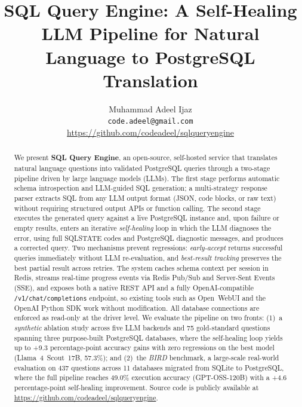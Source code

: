 \documentclass{article}
\title{SQL Query Engine: A Self-Healing LLM Pipeline for Natural Language to PostgreSQL Translation}
\author{
  Muhammad Adeel Ijaz \\
  \texttt{code.adeel@gmail.com} \\
  \url{https://github.com/codeadeel/sqlqueryengine}
}
\date{}
\begin{document}
\maketitle

\begin{abstract}
We present \textbf{SQL Query Engine}, an open-source, self-hosted service that translates natural language questions into validated PostgreSQL queries through a two-stage pipeline driven by large language models (LLMs). The first stage performs automatic schema introspection and LLM-guided SQL generation; a multi-strategy response parser extracts SQL from any LLM output format (JSON, code blocks, or raw text) without requiring structured output APIs or function calling. The second stage executes the generated query against a live PostgreSQL instance and, upon failure or empty results, enters an iterative \emph{self-healing} loop in which the LLM diagnoses the error, using full SQLSTATE codes and PostgreSQL diagnostic messages, and produces a corrected query. Two mechanisms prevent regressions: \emph{early-accept} returns successful queries immediately without LLM re-evaluation, and \emph{best-result tracking} preserves the best partial result across retries. The system caches schema context per session in Redis, streams real-time progress events via Redis Pub/Sub and Server-Sent Events (SSE), and exposes both a native REST API and a fully OpenAI-compatible \texttt{/v1/chat/completions} endpoint, so existing tools such as Open~WebUI and the OpenAI Python SDK work without modification. All database connections are enforced as read-only at the driver level. We evaluate the pipeline on two fronts: (1)~a \emph{synthetic} ablation study across five LLM backends and 75 gold-standard questions spanning three purpose-built PostgreSQL databases, where the self-healing loop yields up to +9.3 percentage-point accuracy gains with zero regressions on the best model (Llama~4~Scout~17B, 57.3\%); and (2)~the \emph{BIRD} benchmark, a large-scale real-world evaluation on 437 questions across 11 databases migrated from SQLite to PostgreSQL, where the full pipeline reaches 49.0\% execution accuracy (GPT-OSS-120B) with a +4.6 percentage-point self-healing improvement. Source code is publicly available at \url{https://github.com/codeadeel/sqlqueryengine}.
\end{abstract}

\end{document}
